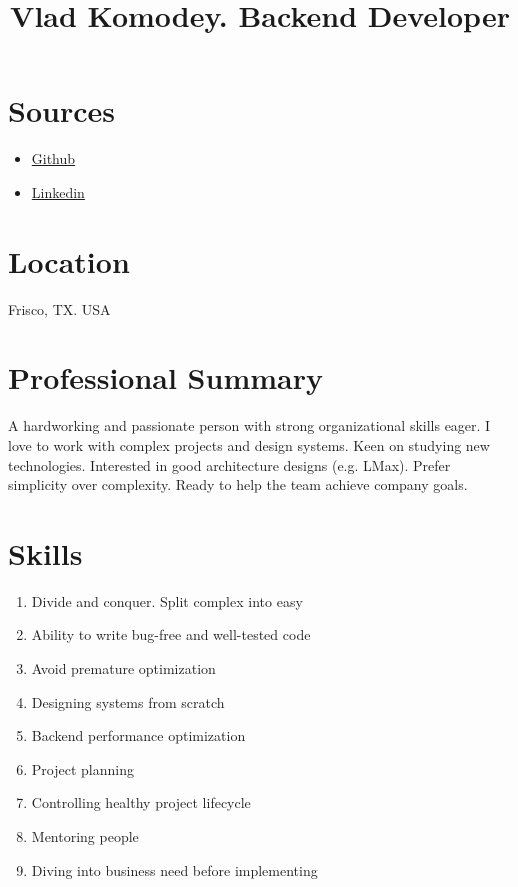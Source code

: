 \documentclass{article}
\title{Vlad Komodey. Backend Developer \vspace{-3em}}
\author{}
\date{}
\begin{document}
\maketitle
\thispagestyle{empty}
\section*{Sources\vspace{-0.5em}}
\begin{itemize}
    \item \href{https://github.com/vkomodey}{Github}
    \item \href{https://www.linkedin.com/in/vladislav-komodey-2b1b4aa0/}{Linkedin}
\end{itemize}

\vspace{-1em}
\section*{Location\vspace{-0.5em}} Frisco, TX. USA

\section*{Professional Summary}

A hardworking and passionate person with strong organizational skills eager. I
love to work with complex projects and design systems. Keen on studying new
technologies. Interested in good architecture designs (e.g. LMax). Prefer simplicity over complexity.
Ready to help the team achieve company goals.

\vspace{-1.5em}
\section*{Skills}

\begin{multicols}{2}
\begin{enumerate}
    \item Divide and conquer. Split complex into easy
    \item Ability to write bug-free and well-tested code
    \item Avoid premature optimization
    \item Designing systems from scratch
    \item Backend performance optimization
    \item Project planning
    \item Controlling healthy project lifecycle
    \item Mentoring people
    \item Diving into business need before implementing

\end{enumerate}
\end{multicols}
\end{document}
